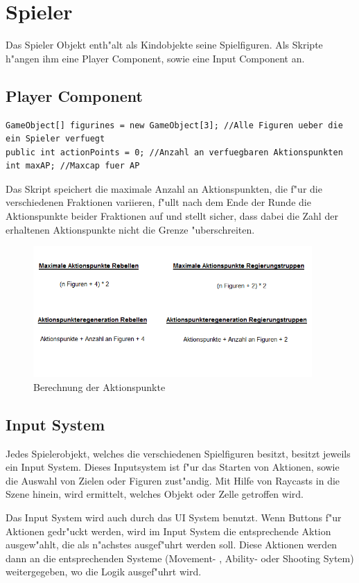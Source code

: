 \chapter{Spieler}

Das Spieler Objekt enth"alt als Kindobjekte seine Spielfiguren. Als Skripte h"angen ihm eine Player Component, sowie eine Input Component an. 
\section{Player Component}
\begin{lstlisting}[breaklines=true]
GameObject[] figurines = new GameObject[3]; //Alle Figuren ueber die ein Spieler verfuegt
public int actionPoints = 0; //Anzahl an verfuegbaren Aktionspunkten
int maxAP; //Maxcap fuer AP
\end{lstlisting}
Das Skript speichert die maximale Anzahl an Aktionspunkten, die f"ur die verschiedenen Fraktionen variieren, f"ullt nach dem Ende der Runde die Aktionspunkte beider Fraktionen auf und stellt sicher, dass dabei die Zahl der erhaltenen Aktionspunkte nicht die Grenze "uberschreiten. 

\begin{figure}
	\centering
	\includegraphics[height=5cm]{images/Aktionspunkte.png}
	\caption{Berechnung der Aktionspunkte}
	\label{fig:Aktionspunkte}
\end{figure}

\section{Input System}
Jedes Spielerobjekt, welches die verschiedenen Spielfiguren besitzt, besitzt jeweils ein Input System.
Dieses Inputsystem ist f"ur das Starten von Aktionen, sowie die Auswahl von Zielen oder Figuren zust"andig. Mit Hilfe von Raycasts in die Szene hinein, wird ermittelt, welches Objekt oder Zelle getroffen wird. 

Das Input System wird auch durch das UI System benutzt. Wenn Buttons f"ur Aktionen gedr"uckt werden, wird im Input System die entsprechende Aktion ausgew"ahlt, die als n"achstes ausgef"uhrt werden soll. Diese Aktionen werden dann an die entsprechenden Systeme (Movement- , Ability- oder Shooting Sytem) weitergegeben, wo die Logik ausgef"uhrt wird.